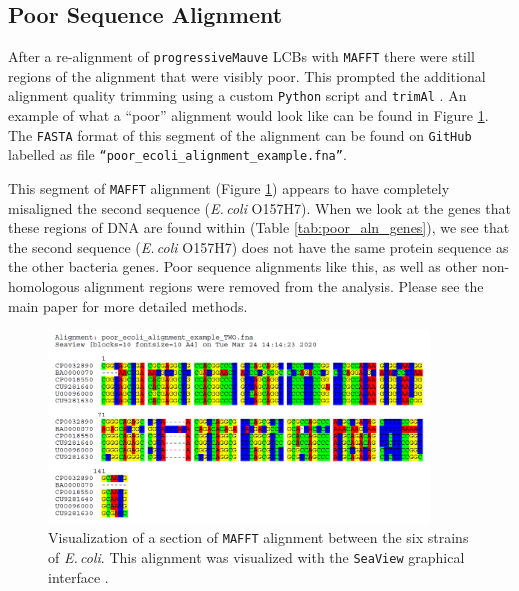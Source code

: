 \documentclass[11pt]{article}
\newcommand{\ecol}{\textit{E.\,coli}\xspace}
\newcommand{\p}{\texttt{progressiveMauve}\xspace}
\begin{document}
\subsection{Poor Sequence Alignment}
After a re-alignment of \p LCBs with \texttt{MAFFT} there were still regions of the alignment that were visibly poor.
This prompted the additional alignment quality trimming using a custom \texttt{Python} script and \texttt{trimAl} \citep{capella2009trimal}.
An example of what a ``poor'' alignment would look like can be found in Figure \ref{fig:ecoli_poor_aln}.
The \texttt{FASTA} format of this segment of the alignment can be found on \texttt{GitHub} labelled as file \texttt{``poor\_ecoli\_alignment\_example.fna''}.

This segment of \texttt{MAFFT} alignment (Figure \ref{fig:ecoli_poor_aln}) appears to have completely misaligned the second sequence (\ecol O157H7).
When we look at the genes that these regions of DNA are found within (Table \ref{tab:poor_aln_genes}), we see that the second sequence (\ecol O157H7) does not have the same protein sequence as the other bacteria genes.
Poor sequence alignments like this, as well as other non-homologous alignment regions were removed from the analysis.
Please see the main paper for more detailed methods.

	\begin{figure}[H]
	\begin{center}
		\includegraphics[width=0.9\textwidth]{./figs/Ecoli_poor_alignment_example.png}
		\caption{\label{fig:ecoli_poor_aln} Visualization of a section of \texttt{MAFFT} alignment between the six strains of \ecol. This alignment was visualized with the \texttt{SeaView} graphical interface \citep{Gouy:10}.}
	\end{center}
\end{figure}
\end{document}
